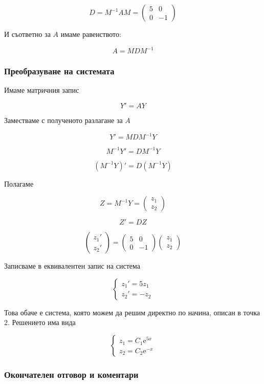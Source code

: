 \documentclass{scrartcl}
\begin{document}
$$
D = M^{-1}AM =
\begin{pmatrix}
    5 & 0 \\ 0 & -1
\end{pmatrix}
$$

И съответно за $A$ имаме равенството:

$$A = MDM^{-1}$$

\subsubsection{Преобразуване на системата}

Имаме матричния запис

$$Y' = AY$$

Заместваме с полученото разлагане за $A$

$$Y' = MDM^{-1}Y$$

$$M^{-1}Y' = DM^{-1}Y$$

$$(M^{-1}Y)' = D(M^{-1}Y)$$

Полагаме

$$
Z = M^{-1}Y =
\begin{pmatrix}
    z_1\\z_2
\end{pmatrix}
$$

$$Z' = DZ$$

$$
\begin{pmatrix}
    z_1'\\z_2'
\end{pmatrix}
=
\begin{pmatrix}
    5 & 0 \\ 0 & -1
\end{pmatrix}
\begin{pmatrix}
    z_1\\z_2
\end{pmatrix}
$$

Записваме в еквивалентен запис на система

$$
\begin{cases}
    z_1' = 5z_1\\
    z_2' = -z_2
\end{cases}
$$

Това обаче е система, която можем да решим директно по начина, описан в точка 2. Решението има вида

$$
\begin{cases}
    z_1 = C_1\mathrm{e}^{5x}\\
    z_2 = C_2\mathrm{e}^{-x}
\end{cases}
$$

\subsubsection{Окончателен отговор и коментари}
\end{document}
